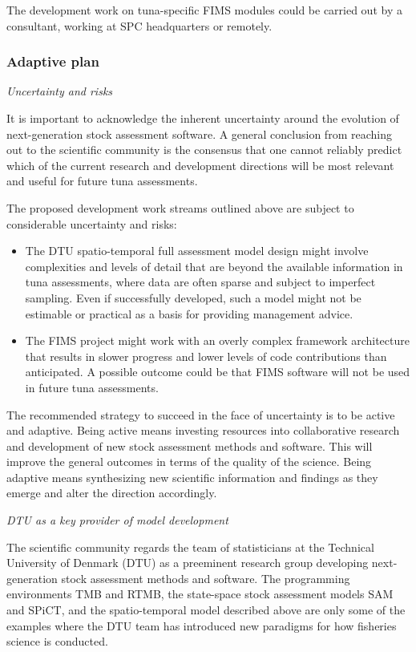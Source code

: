 \documentclass{SCreport}
\begin{document}
The development work on tuna-specific FIMS modules could be carried out by a
consultant, working at SPC headquarters or remotely.

\newpage

\subsubsection{Adaptive plan}

\textit{Uncertainty and risks}

It is important to acknowledge the inherent uncertainty around the evolution of
next-generation stock assessment software. A general conclusion from reaching
out to the scientific community is the consensus that one cannot reliably
predict which of the current research and development directions will be most
relevant and useful for future tuna assessments.

The proposed development work streams outlined above are subject to considerable
uncertainty and risks:

\begin{itemize}
  \item The DTU spatio-temporal full assessment model design might involve
  complexities and levels of detail that are beyond the available information in
  tuna assessments, where data are often sparse and subject to imperfect
  sampling. Even if successfully developed, such a model might not be estimable
  or practical as a basis for providing management advice.
  \item The FIMS project might work with an overly complex framework
  architecture that results in slower progress and lower levels of code
  contributions than anticipated. A possible outcome could be that FIMS software
  will not be used in future tuna assessments.
\end{itemize}

The recommended strategy to succeed in the face of uncertainty is to be active
and adaptive. Being active means investing resources into collaborative research
and development of new stock assessment methods and software. This will improve
the general outcomes in terms of the quality of the science. Being adaptive
means synthesizing new scientific information and findings as they emerge and
alter the direction accordingly.

\vspace{2ex}

\textit{DTU as a key provider of model development}

The scientific community regards the team of statisticians at the Technical
University of Denmark (DTU) as a preeminent research group developing
next-generation stock assessment methods and software. The programming
environments TMB and RTMB, the state-space stock assessment models SAM and
SPiCT, and the spatio-temporal model described above are only some of the
examples where the DTU team has introduced new paradigms for how fisheries
science is conducted.
\end{document}
